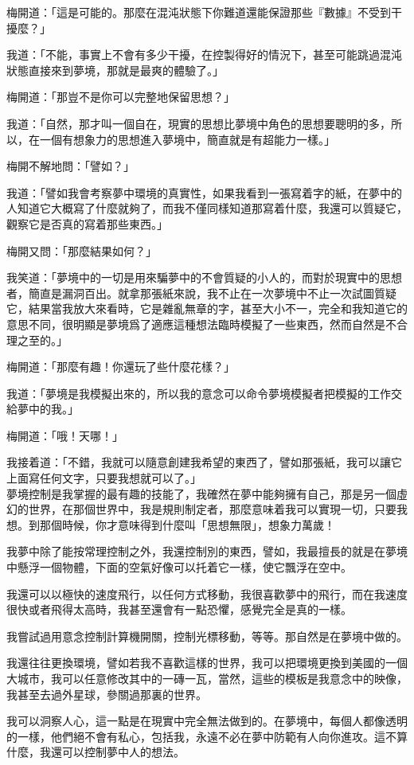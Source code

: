 梅開道：「這是可能的。那麼在混沌狀態下你難道還能保證那些『數據』不受到干擾麼？」

我道：「不能，事實上不會有多少干擾，在控製得好的情況下，甚至可能跳過混沌狀態直接來到夢境，那就是最爽的體驗了。」

梅開道：「那豈不是你可以完整地保留思想？」

我道：「自然，那才叫一個自在，現實的思想比夢境中角色的思想要聰明的多，所以，在一個有想象力的思想進入夢境中，簡直就是有超能力一樣。」

梅開不解地問：「譬如？」

我道：「譬如我會考察夢中環境的真實性，如果我看到一張寫着字的紙，在夢中的人知道它大概寫了什麼就夠了，而我不僅同樣知道那寫着什麼，我還可以質疑它，觀察它是否真的寫着那些東西。」

梅開又問：「那麼結果如何？」

我笑道：「夢境中的一切是用來騙夢中的不會質疑的小人的，而對於現實中的思想者，簡直是漏洞百出。就拿那張紙來說，我不止在一次夢境中不止一次試圖質疑它，結果當我放大來看時，它是雜亂無章的字，甚至大小不一，完全和我知道它的意思不同，很明顯是夢境爲了適應這種想法臨時模擬了一些東西，然而自然是不合理之至的。」

梅開道：「那麼有趣！你還玩了些什麼花樣？」

我道：「夢境是我模擬出來的，所以我的意念可以命令夢境模擬者把模擬的工作交給夢中的我。」

梅開道：「哦！天哪！」

我接着道：「不錯，我就可以隨意創建我希望的東西了，譬如那張紙，我可以讓它上面寫任何文字，只要我想就可以了。」
\\


夢境控制是我掌握的最有趣的技能了，我確然在夢中能夠擁有自己，那是另一個虛幻的世界，在那個世界中，我是規則制定者，那麼意味着我可以實現一切，只要我想。到那個時候，你才意味得到什麼叫「思想無限」，想象力萬歲！

我夢中除了能按常理控制之外，我還控制別的東西，譬如，我最擅長的就是在夢境中懸浮一個物體，下面的空氣好像可以托着它一樣，使它飄浮在空中。

我還可以以極快的速度飛行，以任何方式移動，我很喜歡夢中的飛行，而在我速度很快或者飛得太高時，我甚至還會有一點恐懼，感覺完全是真的一樣。

我嘗試過用意念控制計算機開關，控制光標移動，等等。那自然是在夢境中做的。

我還往往更換環境，譬如若我不喜歡這樣的世界，我可以把環境更換到美國的一個大城市，我可以任意修改其中的一磚一瓦，當然，這些的模板是我意念中的映像，我甚至去過外星球，參關過那裏的世界。

我可以洞察人心，這一點是在現實中完全無法做到的。在夢境中，每個人都像透明的一樣，他們絕不會有私心，包括我，永遠不必在夢中防範有人向你進攻。這不算什麼，我還可以控制夢中人的想法。


